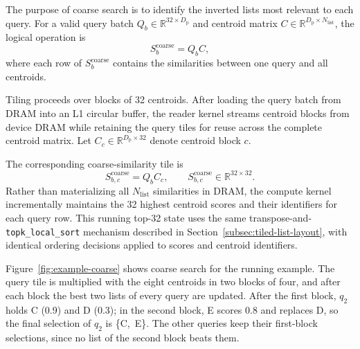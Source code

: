 The purpose of coarse search is to identify the inverted lists most relevant to each query. For a valid query batch \(Q_b\in\mathbb{R}^{32\times D_{\mathrm{p}}}\) and centroid matrix \(C\in\mathbb{R}^{D_{\mathrm{p}}\times N_{\mathrm{list}}}\), the logical operation is
\begin{equation}
S^{\mathrm{coarse}}_b=Q_bC,
\label{eq:coarse-search}
\end{equation}
where each row of \(S^{\mathrm{coarse}}_b\) contains the similarities between one query and all centroids.

Tiling proceeds over blocks of 32 centroids. After loading the query batch from DRAM into an L1 circular buffer, the reader kernel streams centroid blocks from device DRAM while retaining the query tiles for reuse across the complete centroid matrix. Let \(C_c\in\mathbb{R}^{D_{\mathrm{p}}\times32}\) denote centroid block \(c\).

The corresponding coarse-similarity tile is
\begin{equation}
S^{\mathrm{coarse}}_{b,c}=Q_bC_c,
\qquad
S^{\mathrm{coarse}}_{b,c}\in\mathbb{R}^{32\times32}.
\label{eq:coarse-similarity-tile}
\end{equation}
Rather than materializing all \(N_{\mathrm{list}}\) similarities in DRAM, the compute kernel incrementally maintains the 32 highest centroid scores and their identifiers for each query row. This running top-32 state uses the same transpose-and-\texttt{topk\_local\_sort} mechanism described in Section~\ref{subsec:tiled-list-layout}, with identical ordering decisions applied to scores and centroid identifiers.

Figure~\ref{fig:example-coarse} shows coarse search for the running example. The query tile is multiplied with the eight centroids in two blocks of four, and after each block the best two lists of every query are updated. After the first block, \(q_2\) holds C (0.9) and D (0.3); in the second block, E scores 0.8 and replaces D, so the final selection of \(q_2\) is \{C,~E\}. The other queries keep their first-block selections, since no list of the second block beats them.

